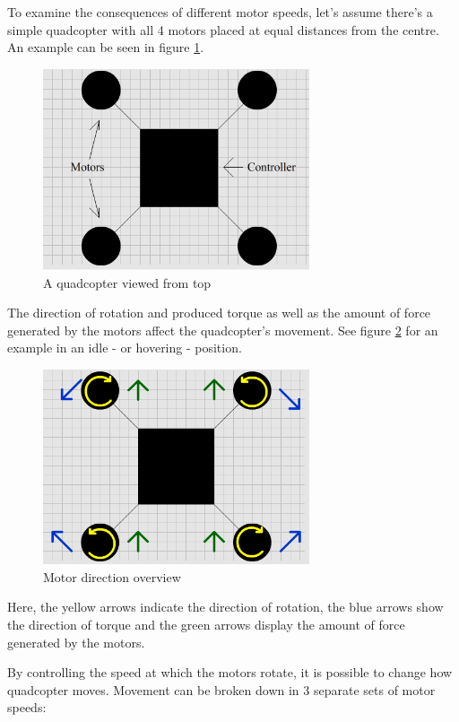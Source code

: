 To examine the consequences of different motor speeds, let's assume there's a simple quadcopter with all 4 motors placed at equal distances from the centre. An example can be seen in figure \ref{droneIdle}.
\begin{figure}[H]
  \centering
    \includegraphics[width=0.7\textwidth]{images/droneIdle.png}
	\caption{A quadcopter viewed from top}
	\label{droneIdle}
\end{figure}

The direction of rotation and produced torque as well as the amount of force generated by the motors affect the quadcopter's movement. See figure \ref{droneDirections} for an example in an idle - or hovering - position.
\begin{figure}[H]
  \centering
    \includegraphics[width=0.7\textwidth]{images/droneDirections.png}
	\caption{Motor direction overview}
	\label{droneDirections}
\end{figure}
Here, the yellow arrows indicate the direction of rotation, the blue arrows show the direction of torque and the green arrows display the amount of force generated by the motors.

By controlling the speed at which the motors rotate, it is possible to change how quadcopter moves. Movement can be broken down in 3 separate sets of motor speeds:

